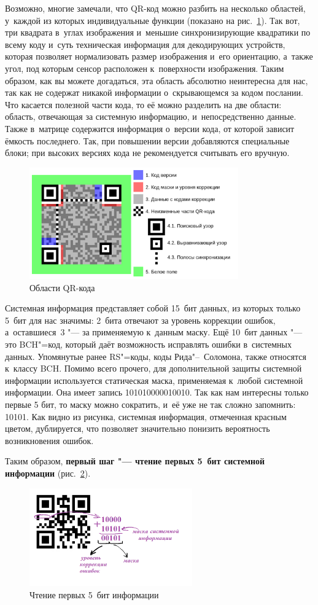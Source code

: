 \documentclass[final,pdftex]{../../template/epsilonj}
\begin{document}
Возможно, многие замечали, что QR-код можно разбить на несколько областей, у~каждой из которых индивидуальные функции (показано на рис.~\ref{fig:oblasti}). Так вот, три квадрата в~углах изображения и~меньшие синхронизирующие квадратики по всему коду и~суть техническая информация для декодирующих устройств, которая позволяет нормализовать размер изображения и~его ориентацию, а~также угол, под которым сенсор расположен к~поверхности изображения. Таким образом, как вы можете догадаться, эта область абсолютно неинтересна для нас, так как не содержат никакой информации о~скрывающемся за кодом послании. Что касается полезной части кода, то её можно разделить на две области: область, отвечающая за системную информацию, и~непосредственно данные. Также в~матрице содержится информация о~версии кода, от которой зависит ёмкость последнего. Так, при повышении версии добавляются специальные блоки; при высоких версиях кода не рекомендуется считывать его вручную.

\begin{figure}[hbt]
			\includegraphics[width=90mm]{qr1.png} 
			\caption{Области QR-кода}\label{fig:oblasti}
\end{figure}

Системная информация представляет собой 15~бит данных, из которых только 5~бит для нас значимы: 2~бита отвечают за уровень коррекции ошибок, а~оставшиеся~3 "--- за применяемую к~данным маску. Ещё 10~бит данных "--- это BCH"=код, который даёт возможность исправлять ошибки в~системных данных. Упомянутые ранее RS"=коды, коды Рида"--~Соломона, также относятся к~классу BCH. Помимо всего прочего, для дополнительной защиты системной информации используется статическая маска, применяемая к~любой системной информации. Она имеет запись 101010000010010. Так как нам интересны только первые 5 бит, то маску можно сократить, и~её уже не так сложно запомнить: 10101. Как видно из рисунка, системная информация, отмеченная красным цветом, дублируется, что позволяет значительно понизить вероятность возникновения ошибок.


Таким образом, \textbf{первый шаг "--- чтение первых 5~бит системной информации} (рис.~\ref{fig:fivebits}).
\begin{figure}[htbp]
	\includegraphics[width=70mm]{1.png}
	\caption{Чтение первых 5~бит информации}\label{fig:fivebits}
\end{figure}
\end{document}
